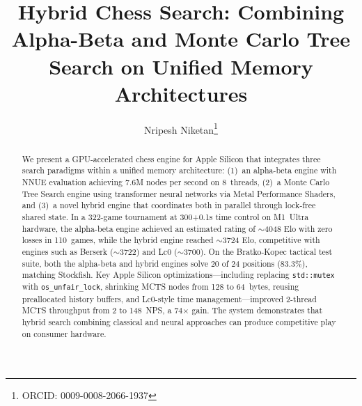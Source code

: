 \documentclass{svproc}
\newcommand{\stdmutex}{\texttt{std::\allowbreak mutex}}
\newcommand{\osunfairlock}{\texttt{os\_\allowbreak unfair\_\allowbreak lock}}
\begin{document}
\mainmatter

\title{Hybrid Chess Search: Combining Alpha-Beta and Monte Carlo Tree Search on Unified Memory Architectures}


\author{Nripesh Niketan\thanks{ORCID: 0009-0008-2066-1937}}



\maketitle


\begin{abstract}
We present a GPU-accelerated chess engine for Apple Silicon that integrates three search paradigms within a unified memory architecture: (1)~an alpha-beta engine with NNUE evaluation achieving 7.6M nodes per second on 8~threads, (2)~a Monte Carlo Tree Search engine using transformer neural networks via Metal Performance Shaders, and (3)~a novel hybrid engine that coordinates both in parallel through lock-free shared state. In a 322-game tournament at 300+0.1s time control on M1~Ultra hardware, the alpha-beta engine achieved an estimated rating of $\sim$4048 Elo with zero losses in 110~games, while the hybrid engine reached $\sim$3724 Elo, competitive with engines such as Berserk ($\sim$3722) and Lc0 ($\sim$3700). On the Bratko-Kopec tactical test suite, both the alpha-beta and hybrid engines solve 20 of 24 positions (83.3\%), matching Stockfish. Key Apple Silicon optimizations---including replacing \stdmutex{} with \osunfairlock{}, shrinking MCTS nodes from 128 to 64~bytes, reusing preallocated history buffers, and Lc0-style time management---improved 2-thread MCTS throughput from 2 to 148~NPS, a 74$\times$ gain. The system demonstrates that hybrid search combining classical and neural approaches can produce competitive play on consumer hardware.

\end{abstract}
\end{document}
